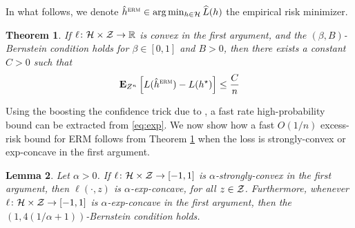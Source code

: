 \documentclass{article}
\newtheorem{theorem}{Theorem}
\newtheorem{lemma}[theorem]{Lemma}
\begin{document}
{In what follows, we denote $\hat h^{\textsc{erm}} \in \arg\min_{h \in \mathcal H} \widehat L(h)$ the empirical risk minimizer.
\begin{theorem}
	\label{thm:bern}
	If $\ell\colon \mathcal H \times \mathcal Z \rightarrow {\mathbb R}$ is convex in the first argument, and the $(\beta, B)$-Bernstein condition holds for $\beta \in[0,1]$ and $B>0$, then there exists a constant $C>0$ such that
	\begin{align}
	\mathbf{E}_{Z^n}\left[ L(\hat h^{\textsc{erm}}) - L(h^\star)\right] \leq \frac{C}{n} \label{eq:exp}
	\end{align}
\end{theorem}
Using the boosting the confidence trick due to \cite[Theorem~4]{mehta2017fast}, a fast rate high-probability bound can be extracted from \eqref{eq:exp}. We now show how a fast $O(1/n)$ excess-risk bound for ERM follows from Theorem \ref{thm:bern} when the loss is strongly-convex or exp-concave in the first argument. 
\begin{lemma}
	\label{lem:translation}
	Let $\alpha >0$. If $\ell\colon \mathcal H \times \mathcal Z \rightarrow [-1,1]$ is $\alpha$-strongly-convex in the first argument, then $\ell(\cdot, z)$ is $\alpha$-exp-concave, for all $z\in \mathcal Z$.  
	Furthermore, whenever $\ell\colon \mathcal H \times \mathcal Z \rightarrow [-1,1]$ is $\alpha$-exp-concave in the first argument, then the $(1, 4(1/\alpha+1))$-Bernstein condition holds. 
\end{lemma}

}
\end{document}
